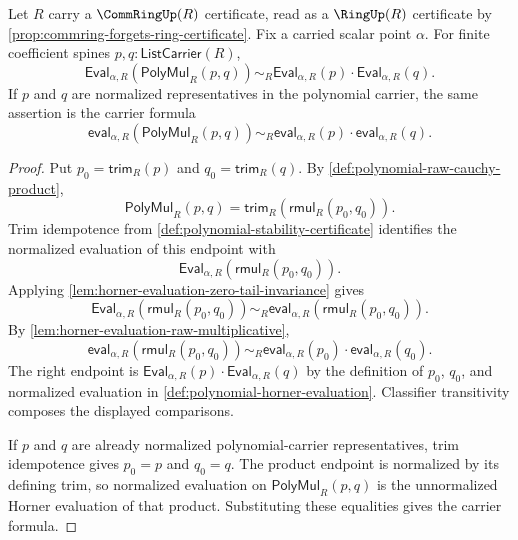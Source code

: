 \begin{theorem}
\label{thm:polynomial-evaluation-multiplicative-homomorphism}
Let $R$ carry a $\CommRingUp(R)$ certificate, read as a $\RingUp(R)$ certificate by \autoref{prop:commring-forgets-ring-certificate}. Fix a carried scalar point $\alpha$. For finite coefficient spines $p,q:\mathsf{ListCarrier}(R)$,
$$
\mathsf{Eval}_{\alpha,R}(\mathsf{PolyMul}_R(p,q))\sim_R
\mathsf{Eval}_{\alpha,R}(p)\cdot\mathsf{Eval}_{\alpha,R}(q).
$$
If $p$ and $q$ are normalized representatives in the polynomial carrier, the same assertion is the carrier formula
$$
\mathsf{eval}_{\alpha,R}(\mathsf{PolyMul}_R(p,q))\sim_R
\mathsf{eval}_{\alpha,R}(p)\cdot\mathsf{eval}_{\alpha,R}(q).
$$
\end{theorem}
\begin{proof}
Put $p_0=\mathsf{trim}_R(p)$ and $q_0=\mathsf{trim}_R(q)$. By \autoref{def:polynomial-raw-cauchy-product},
$$
\mathsf{PolyMul}_R(p,q)=\mathsf{trim}_R(\mathsf{rmul}_R(p_0,q_0)).
$$
Trim idempotence from \autoref{def:polynomial-stability-certificate} identifies the normalized evaluation of this endpoint with
$$
\mathsf{Eval}_{\alpha,R}(\mathsf{rmul}_R(p_0,q_0)).
$$
Applying \autoref{lem:horner-evaluation-zero-tail-invariance} gives
$$
\mathsf{Eval}_{\alpha,R}(\mathsf{rmul}_R(p_0,q_0))\sim_R
\mathsf{eval}_{\alpha,R}(\mathsf{rmul}_R(p_0,q_0)).
$$
By \autoref{lem:horner-evaluation-raw-multiplicative},
$$
\mathsf{eval}_{\alpha,R}(\mathsf{rmul}_R(p_0,q_0))\sim_R
\mathsf{eval}_{\alpha,R}(p_0)\cdot\mathsf{eval}_{\alpha,R}(q_0).
$$
The right endpoint is $\mathsf{Eval}_{\alpha,R}(p)\cdot\mathsf{Eval}_{\alpha,R}(q)$ by the definition of $p_0$, $q_0$, and normalized evaluation in \autoref{def:polynomial-horner-evaluation}. Classifier transitivity composes the displayed comparisons.

If $p$ and $q$ are already normalized polynomial-carrier representatives, trim idempotence gives $p_0=p$ and $q_0=q$. The product endpoint is normalized by its defining trim, so normalized evaluation on $\mathsf{PolyMul}_R(p,q)$ is the unnormalized Horner evaluation of that product. Substituting these equalities gives the carrier formula.
\end{proof}

